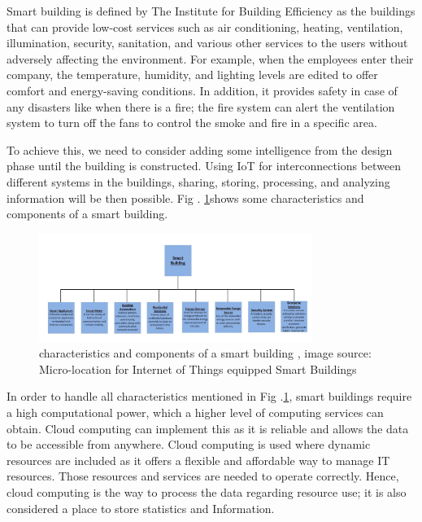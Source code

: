 \documentclass[conference]{IEEEtran}
\begin{document}
Smart building is defined by The Institute for Building Efficiency \cite{smartB} \cite{mic}as the buildings that can provide low-cost services such as air conditioning, heating, ventilation, illumination, security, sanitation, and various other services to the users without adversely affecting the environment\cite{micro}. For example, when the employees enter their company, the temperature, humidity, and lighting levels are edited to offer comfort and energy-saving conditions. In addition, it provides safety in case of any disasters like when there is a fire; the fire system can alert the ventilation system to turn off the fans to control the smoke and fire in a specific area.


To achieve this, we need to consider adding some intelligence from the design phase until the building is constructed. Using IoT for interconnections between different systems in the buildings, sharing, storing, processing, and analyzing information will be  then possible. Fig . \ref{char}shows some characteristics and components
of a smart building. 



\begin{figure}[h!]
	\centering
	\includegraphics[width=3.5in]{charsb.png}
	\caption{\label{char}  characteristics and components
of a smart building
		, image source: Micro-location for Internet of Things equipped
Smart Buildings
		\cite{mic} }
\end{figure}


In order to handle all characteristics mentioned in Fig .\ref{char}, smart buildings require a high computational power, which a higher level of computing services can obtain. Cloud computing can implement this as it is reliable and allows the data to be accessible from anywhere. Cloud computing is used where dynamic resources are included as it offers a flexible and affordable way to manage IT resources. Those resources and services are needed to operate correctly. Hence, cloud computing is the way to process the data regarding resource use; it is also considered a place to store statistics and Information. \cite{frame}
\end{document}
